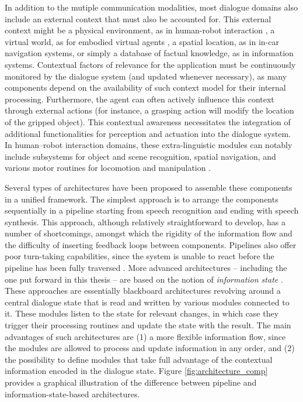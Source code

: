 In addition to the mutiple communication modalities, most dialogue domains also include an external context that must also be accounted for.  This external context might be a physical environment, as in human-robot interaction \citep{goodrich2007human}, a virtual world, as for embodied virtual agents \citep{kopp2003max}, a spatial location, as in in-car navigation systems, or simply a database of factual knowledge, as in information systems. Contextual factors of relevance for the application must be continuously monitored by the dialogue system (and updated whenever necessary), as many components depend on the availability of such context model for their internal processing.  Furthermore, the agent can often actively influence this context through external actions (for instance, a grasping action will modify the location of the gripped object).   This contextual awareness necessitates the integration of additional functionalities for perception and actuation into the dialogue system. In human--robot interaction domains, these extra-linguistic modules can notably include subsystems for object and scene recognition, spatial navigation, and various motor routines for locomotion and manipulation  \citep{1570637,HawesSWZJKBBS07}. 

Several types of architectures have been proposed to assemble these components in a unified framework.  The simplest approach is to arrange the components sequentially in a pipeline starting from speech recognition and ending with speech synthesis.  This approach, although relatively straightforward to develop, has a number of shortcomings, amongst which the rigidity of the information flow and the difficulty of inserting feedback loops between components. Pipelines also offer poor turn-taking capabilities, since the system is unable to react before the pipeline has been fully traversed \citep{RauxE09}. More advanced architectures -- including the one put forward in this thesis -- are based on the notion of \textit{information state} \citep{larsson2000information,bos2003dipper}.  These approaches are essentially blackboard architectures revolving around a central dialogue state that is read and written by various modules connected to it.  These modules listen to the state for relevant changes, in which case they trigger their processing routines and update the state with the result.  The main advantages of such architectures are (1) a more flexible information flow, since the modules are allowed to process and update information in any order, and (2) the possibility to define modules that take full advantage of the contextual information encoded in the dialogue state.  Figure \ref{fig:architecture_comp} provides a graphical illustration of the difference between pipeline and information-state-based architectures.  

